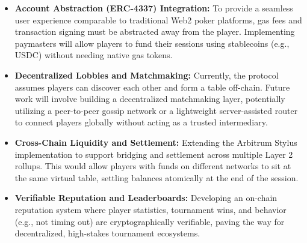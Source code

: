 \documentclass[11pt, a4paper]{article}
\begin{document}
\begin{itemize}
    \item \textbf{Account Abstraction (ERC-4337) Integration:} To provide a seamless user experience comparable to traditional Web2 poker platforms, gas fees and transaction signing must be abstracted away from the player. Implementing paymasters will allow players to fund their sessions using stablecoins (e.g., USDC) without needing native gas tokens.
    \item \textbf{Decentralized Lobbies and Matchmaking:} Currently, the protocol assumes players can discover each other and form a table off-chain. Future work will involve building a decentralized matchmaking layer, potentially utilizing a peer-to-peer gossip network or a lightweight server-assisted router to connect players globally without acting as a trusted intermediary.
    \item \textbf{Cross-Chain Liquidity and Settlement:} Extending the Arbitrum Stylus implementation to support bridging and settlement across multiple Layer 2 rollups. This would allow players with funds on different networks to sit at the same virtual table, settling balances atomically at the end of the session.
    \item \textbf{Verifiable Reputation and Leaderboards:} Developing an on-chain reputation system where player statistics, tournament wins, and behavior (e.g., not timing out) are cryptographically verifiable, paving the way for decentralized, high-stakes tournament ecosystems.
\end{itemize}
\end{document}
